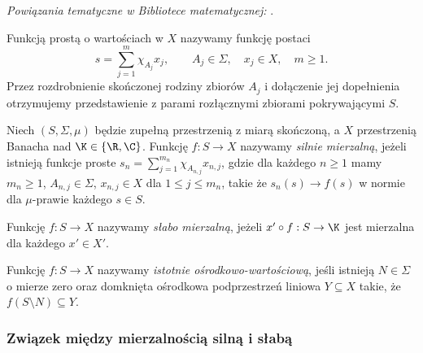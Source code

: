 \noindent\emph{Powiązania tematyczne w Bibliotece matematycznej:} .


\begin{definicja}
\label{def:vector-simple15b}
Funkcją prostą o wartościach w $X$ nazywamy funkcję
postaci
\[
 s=\sum_{j=1}^m\chi_{A_j}x_j,\qquad
 A_j\in\Sigma,\quad x_j\in X,\quad m\ge1.
\]
Przez rozdrobnienie skończonej rodziny zbiorów $A_j$
i dołączenie jej dopełnienia otrzymujemy przedstawienie
z parami rozłącznymi zbiorami pokrywającymi $S$.
\end{definicja}

\begin{definicja}
\label{def:measurability15b}
Niech $(S,\Sigma,\mu)$ będzie zupełną przestrzenią z miarą
skończoną, a $X$ przestrzenią Banacha nad $\K\in\{\R,\C\}$.
Funkcję $f:S\to X$ nazywamy \emph{silnie mierzalną}, jeżeli istnieją
funkcje proste $s_n=\sum_{j=1}^{m_n}\chi_{A_{n,j}}x_{n,j}$,
gdzie dla każdego $n\ge1$ mamy $m_n\ge1$, $A_{n,j}\in\Sigma$,
$x_{n,j}\in X$ dla $1\le j\le m_n$, takie że $s_n(s)\to f(s)$
w normie dla $\mu$-prawie każdego $s\in S$.
\end{definicja}

\begin{definicja}
\label{def:weak-measurable15b}
Funkcję $f:S\to X$ nazywamy \emph{słabo mierzalną}, jeżeli
$x'\circ f:S\to\K$ jest mierzalna dla każdego $x'\in X'$.
\end{definicja}

\begin{definicja}
\label{def:essential-separable-range15b}
Funkcję $f:S\to X$ nazywamy
\emph{istotnie ośrodkowo-wartościową}, jeśli istnieją
$N\in\Sigma$ o mierze zero oraz domknięta ośrodkowa
podprzestrzeń liniowa $Y\subseteq X$ takie, że
$f(S\setminus N)\subseteq Y$.
\end{definicja}

\subsubsection{Związek między mierzalnością silną i słabą}


